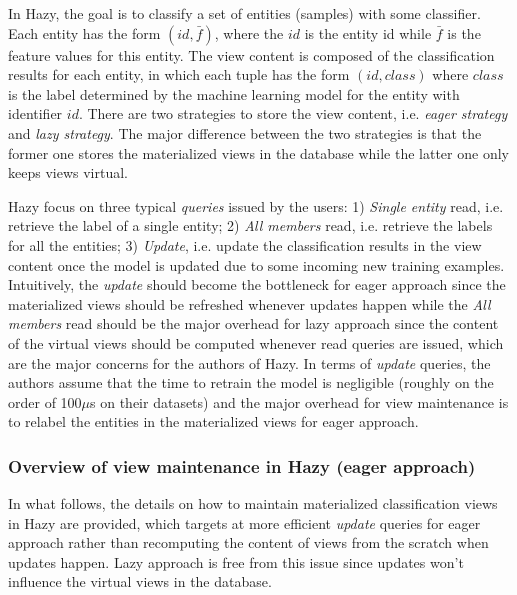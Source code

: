 In Hazy, the goal is to classify a set of entities (samples) with some classifier. Each entity has the form $(id, \bar{f})$, where the $id$ is the entity id while $\bar{f}$ is the feature values for this entity. The view content is composed of the classification results for each entity, in which each tuple has the form $(id, class)$ where $class$ is the label determined by the machine learning model for the entity with identifier $id$. There are two strategies to store the view content, i.e. {\em eager strategy} and {\em lazy strategy}. The major difference between the two strategies is that the former one stores the materialized views in the database while the latter one only keeps views virtual.

Hazy focus on three typical {\em queries} issued by the users: 1) {\em Single entity} read, i.e. retrieve the label of a single entity; 2) {\em All members} read, i.e. retrieve the labels for all the entities; 3) {\em Update}, i.e. update the classification results in the view content once the model is updated due to some incoming new training examples. Intuitively, the {\em update} should become the bottleneck for eager approach since the materialized views should be refreshed whenever updates happen while the {\em All members} read should be the major overhead for lazy approach since the content of the virtual views should be computed whenever read queries are issued, which are the major concerns for the authors of Hazy. In terms of {\em update} queries, the authors assume that the time to retrain the model is negligible (roughly on the order of 100$\mu$s on their datasets) and the major overhead for view maintenance is to relabel the entities in the materialized views for eager approach. 

\subsubsection{Overview of view maintenance in Hazy (eager approach)}
In what follows, the details on how to maintain materialized classification views in Hazy are provided, which targets at more efficient {\em update} queries for eager approach rather than recomputing the content of views from the scratch when updates happen. Lazy approach is free from this issue since updates won't influence the virtual views in the database. 

